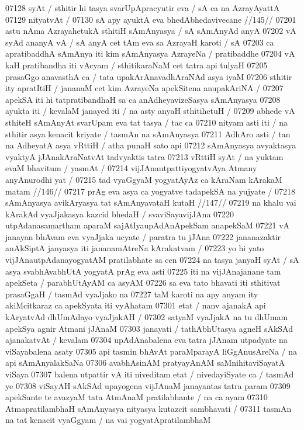 07128 syAt / sthitir hi tasya svarUpApracyutir eva / sA ca na AzrayAyattA
07129 nityatvAt /  
07130 	sA apy ayuktA eva bhedAbhedavivecane //145//  
07201 astu nAma AzrayahetukA sthitiH sAmAnyasya / sA sAmAnyAd anyA
07202 vA syAd ananyA vA / sA anyA cet tAm eva sa AzrayaH karoti / sA
07203 ca apratibaddhA sAmAnya iti kim sAmAnyasya AzrayeNa / pratibaddhe
07204 vA kaH pratibandha iti vAcyam / sthitikaraNaM cet tatra api tulyaH  
07205 prasaGgo anavasthA ca / tata upakArAnavadhAraNAd asya iyaM 
07206 sthitir ity apratItiH / jananaM cet kim AzrayeNa apekSitena anupakAriNA /
07207 apekSA iti hi tatpratibandhaH sa ca anAdheyavizeSasya  sAmAnyasya 
07208 ayukta iti / kevalaM janayed iti / na asty anyaH sthitihetuH /  
07209 abhede vA sthiteH sAmAnyAt svarUpam eva tat tasya / tac ca  
07210 nityam asti iti / na sthitir asya kenacit kriyate / tasmAn na sAmAnyasya
07211 AdhAro asti / tan na AdheyatA asya vRttiH / atha punaH sato api 
07212 sAmAnyasya avyaktasya vyaktyA jJAnakAraNatvAt tadvyaktis tatra 
07213 vRttiH syAt / na yuktam evaM bhavitum / yasmAt /
07214 	vijJAnautpattiyogyatvAya Atmany anyAnurodhi yat / 
07215 	tad vyaGgyaM yogyatAyAz ca kAraNam kArakaM matam //146//
07217 	prAg eva asya ca yogyatve tadapekSA na yujyate /
07218 	sAmAnyasya avikAryasya tat sAmAnyavataH kutaH //147//
07219 na khalu vai kArakAd vyaJjakasya kazcid bhedaH / svaviSayavijJAna
07220 utpAdanasamartham aparaM sajAtIyaupAdAnApekSam anapekSaM
07221 vA janayan bhAvam eva vyaJjaka ucyate / paratra tu jJAna  
07222 jananazaktir anAkSiptA janyasya iti jananamAtreNa kArakatvam /
07223 yo hi yato vijJAnautpAdanayogyatAM pratilabhate sa cen
07224 na tasya janyaH syAt / sA asya svabhAvabhUtA yogyatA prAg eva asti
07225 iti na vijJAnajanane tam apekSeta / parabhUtAyAM ca asyAM 
07226 sa eva tato bhavati iti sthitivat prasaGgaH / tasmAd vyaJjako na  
07227 taM karoti na apy anyam ity akiMcitkaraz ca apekSyata iti vyAhatam 
07301 etat / nanv ajanakA api kAryatvAd dhUmAdayo vyaJjakAH /  
07302 satyaM vyaJjakA na tu dhUmam apekSya agnir Atmani jJAnaM  
07303 janayati / tathAbhUtasya agneH sAkSAd ajanakatvAt / kevalam 
07304 upAdAnabalena eva tatra jJAnam utpadyate na viSayabalena asaty 
07305 api tasmin bhAvAt paraMparayA liGgAnusAreNa / na api  sAmAnyalakSaNa
07306 avabhAsinAM pratyayAnAM saMnihitaviSayatA viSaya 
07307 balena utpattir vA iti niveditam etat / nivedayiSyate ca / tasmAd ye 
07308 viSayAH sAkSAd upayogena vijJAnaM janayantas tatra param  
07309 apekSante te avazyaM tata AtmAnaM pratilabhante / na ca ayam
07310 AtmapratilambhaH sAmAnyasya nityasya kutazcit sambhavati /
07311 tasmAn na tat kenacit vyaGgyam / na vai yogyatApratilambhaM
